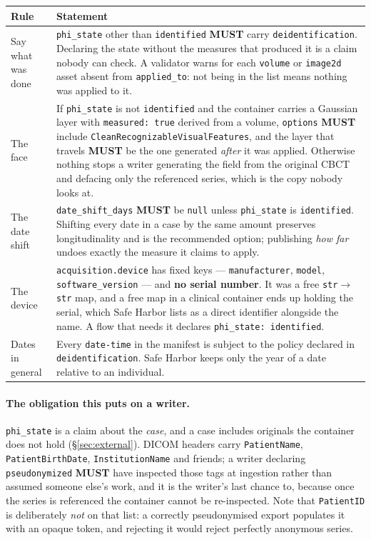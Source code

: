\documentclass[11pt,a4paper]{article}
\newcommand{\MUST}{\textcolor{uosred}{\textbf{MUST}}}
\newcommand{\code}[1]{\texttt{\small #1}}
\begin{document}
\begin{longtable}{L{3.6cm} L{11.8cm}}
\toprule
\textbf{Rule} & \textbf{Statement}\\
\midrule
\endhead
Say what was done & \code{phi\_state} other than \code{identified} \MUST{} carry
\code{deidentification}. Declaring the state without the measures that produced it is a
claim nobody can check. A validator warns for each \code{volume} or \code{image2d} asset
absent from \code{applied\_to}: not being in the list means nothing was applied to it.\\
The face & If \code{phi\_state} is not \code{identified} and the container carries a
Gaussian layer with \code{measured: true} derived from a volume, \code{options} \MUST{}
include \code{CleanRecognizableVisualFeatures}, and the layer that travels \MUST{} be the
one generated \emph{after} it was applied. Otherwise nothing stops a writer generating the
field from the original CBCT and defacing only the referenced series, which is the copy
nobody looks at.\\
The date shift & \code{date\_shift\_days} \MUST{} be \code{null} unless \code{phi\_state}
is \code{identified}. Shifting every date in a case by the same amount preserves
longitudinality and is the recommended option; publishing \emph{how far} undoes exactly the
measure it claims to apply.\\
The device & \code{acquisition.device} has fixed keys --- \code{manufacturer},
\code{model}, \code{software\_version} --- and \textbf{no serial number}. It was a free
\code{str}$\to$\code{str} map, and a free map in a clinical container ends up holding the
serial, which Safe Harbor lists as a direct identifier alongside the name. A flow that
needs it declares \code{phi\_state: identified}.\\
Dates in general & Every \code{date-time} in the manifest is subject to the policy declared
in \code{deidentification}. Safe Harbor keeps only the year of a date relative to an
individual.\\
\bottomrule
\end{longtable}

\paragraph{The obligation this puts on a writer.} \code{phi\_state} is a claim about the
\emph{case}, and a case includes originals the container does not hold
(\S\ref{sec:external}). DICOM headers carry \code{PatientName}, \code{PatientBirthDate},
\code{InstitutionName} and friends; a writer declaring \code{pseudonymized} \MUST{} have
inspected those tags at ingestion rather than assumed someone else's work, and it is the
writer's last chance to, because once the series is referenced the container cannot be
re-inspected. Note that \code{PatientID} is deliberately \emph{not} on that list: a
correctly pseudonymised export populates it with an opaque token, and rejecting it would
reject perfectly anonymous series.
\end{document}
